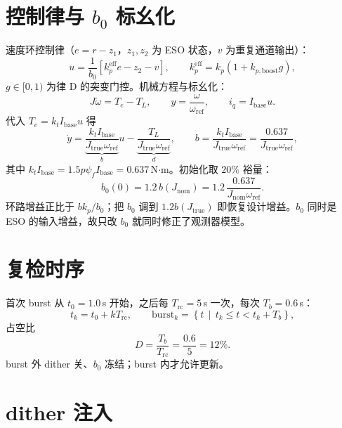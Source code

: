 \documentclass[11pt,a4paper]{article}
\newcommand{\Jnom}{J_{\mathrm{nom}}}
\newcommand{\Jtrue}{J_{\mathrm{true}}}
\newcommand{\bzero}{b_0}
\newcommand{\wref}{\omega_{\mathrm{ref}}}
\newcommand{\Te}{T_e}
\begin{document}
\section{控制律与 $\bzero$ 标幺化}

速度环控制律（$e=r-z_1$，$z_1,z_2$ 为 ESO 状态，$v$ 为重复通道输出）：
\begin{equation}
u=\frac{1}{\bzero}\left[k_p^{\mathrm{eff}}e-z_2-v\right],\qquad
k_p^{\mathrm{eff}}=k_p\left(1+k_{p,\mathrm{boost}}g\right),
\label{eq:law}
\end{equation}
$g\in[0,1)$ 为律 D 的突变门控。机械方程与标幺化：
\begin{equation}
J\dot\omega=\Te-T_L,\qquad
y=\frac{\omega}{\wref},\qquad i_q=I_{\mathrm{base}}u.
\label{eq:mech}
\end{equation}
代入 $\Te=k_tI_{\mathrm{base}}u$ 得
\begin{equation}
\dot y=\underbrace{\frac{k_tI_{\mathrm{base}}}{\Jtrue\wref}}_{b}u-\underbrace{\frac{T_L}{\Jtrue\wref}}_{d},
\qquad
b=\frac{k_tI_{\mathrm{base}}}{\Jtrue\wref}=\frac{0.637}{\Jtrue\wref},
\label{eq:bplant}
\end{equation}
其中 $k_tI_{\mathrm{base}}=1.5p\psi_fI_{\mathrm{base}}=0.637$\,N$\cdot$m。初始化取 $20\%$ 裕量：
\begin{equation}
\bzero(0)=1.2\,b(\Jnom)=1.2\,\frac{0.637}{\Jnom\wref}.
\label{eq:b0init}
\end{equation}
环路增益正比于 $b k_p/\bzero$；把 $\bzero$ 调到 $1.2b(\Jtrue)$ 即恢复设计增益。$\bzero$ 同时是 ESO 的输入增益，故只改 $\bzero$ 就同时修正了观测器模型。

\section{复检时序}

首次 burst 从 $t_0=1.0$\,s 开始，之后每 $T_{\mathrm{rc}}=5$\,s 一次，每次 $T_b=0.6$\,s：
\begin{equation}
t_k=t_0+kT_{\mathrm{rc}},\qquad
\mathrm{burst}_k=\left\{t\,\middle|\,t_k\le t<t_k+T_b\right\},
\label{eq:schedule}
\end{equation}
占空比
\begin{equation}
D=\frac{T_b}{T_{\mathrm{rc}}}=\frac{0.6}{5}=12\%.
\label{eq:duty}
\end{equation}
burst 外 dither 关、$\bzero$ 冻结；burst 内才允许更新。

\section{dither 注入}
\end{document}
